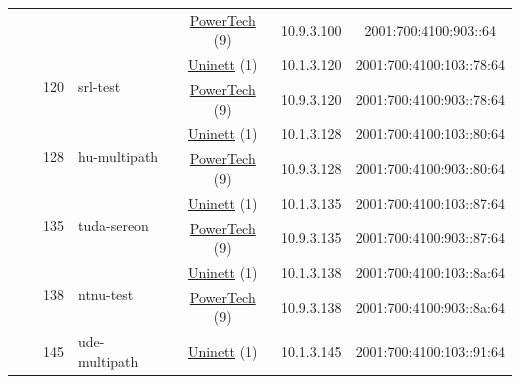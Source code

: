 \begin{small}
\begin{center}
\begin{longtable}{|c|c|c|c|c|c|c|c|}
  &  & \multicolumn{2}{|c|}{} & \multicolumn{2}{|c|}{\tiny{\href{http://www.powertech.no}{PowerTech} (9)}} & \tiny{10.9.3.100} & \tiny{2001:700:4100:903::64} \\* \cline{3-3}\cline{4-4}\cline{5-5}\cline{6-6}\cline{7-7}\cline{8-8}
  &  & \multirow{2}{*}{\tiny{120}} & \multicolumn{1}{|l|}{\multirow{2}{*}{\tiny{srl-test}}} & \multicolumn{2}{|c|}{\tiny{\href{https://www.uninett.no}{Uninett} (1)}} & \tiny{10.1.3.120} & \tiny{2001:700:4100:103::78:64} \\* \cline{5-5}\cline{6-6}\cline{7-7}\cline{8-8}
  &  &  &  & \multicolumn{2}{|c|}{\tiny{\href{http://www.powertech.no}{PowerTech} (9)}} & \tiny{10.9.3.120} & \tiny{2001:700:4100:903::78:64} \\* \cline{3-3}\cline{4-4}\cline{5-5}\cline{6-6}\cline{7-7}\cline{8-8}
  &  & \multirow{2}{*}{\tiny{128}} & \multicolumn{1}{|l|}{\multirow{2}{*}{\tiny{hu-multipath}}} & \multicolumn{2}{|c|}{\tiny{\href{https://www.uninett.no}{Uninett} (1)}} & \tiny{10.1.3.128} & \tiny{2001:700:4100:103::80:64} \\* \cline{5-5}\cline{6-6}\cline{7-7}\cline{8-8}
  &  &  &  & \multicolumn{2}{|c|}{\tiny{\href{http://www.powertech.no}{PowerTech} (9)}} & \tiny{10.9.3.128} & \tiny{2001:700:4100:903::80:64} \\* \cline{3-3}\cline{4-4}\cline{5-5}\cline{6-6}\cline{7-7}\cline{8-8}
  &  & \multirow{2}{*}{\tiny{135}} & \multicolumn{1}{|l|}{\multirow{2}{*}{\tiny{tuda-sereon}}} & \multicolumn{2}{|c|}{\tiny{\href{https://www.uninett.no}{Uninett} (1)}} & \tiny{10.1.3.135} & \tiny{2001:700:4100:103::87:64} \\* \cline{5-5}\cline{6-6}\cline{7-7}\cline{8-8}
  &  &  &  & \multicolumn{2}{|c|}{\tiny{\href{http://www.powertech.no}{PowerTech} (9)}} & \tiny{10.9.3.135} & \tiny{2001:700:4100:903::87:64} \\* \cline{3-3}\cline{4-4}\cline{5-5}\cline{6-6}\cline{7-7}\cline{8-8}
  &  & \multirow{2}{*}{\tiny{138}} & \multicolumn{1}{|l|}{\multirow{2}{*}{\tiny{ntnu-test}}} & \multicolumn{2}{|c|}{\tiny{\href{https://www.uninett.no}{Uninett} (1)}} & \tiny{10.1.3.138} & \tiny{2001:700:4100:103::8a:64} \\* \cline{5-5}\cline{6-6}\cline{7-7}\cline{8-8}
  &  &  &  & \multicolumn{2}{|c|}{\tiny{\href{http://www.powertech.no}{PowerTech} (9)}} & \tiny{10.9.3.138} & \tiny{2001:700:4100:903::8a:64} \\* \cline{3-3}\cline{4-4}\cline{5-5}\cline{6-6}\cline{7-7}\cline{8-8}
  &  & \multirow{2}{*}{\tiny{145}} & \multicolumn{1}{|l|}{\multirow{2}{*}{\tiny{ude-multipath}}} & \multicolumn{2}{|c|}{\tiny{\href{https://www.uninett.no}{Uninett} (1)}} & \tiny{10.1.3.145} & \tiny{2001:700:4100:103::91:64} \\* \cline{5-5}\cline{6-6}\cline{7-7}\cline{8-8}

\end{longtable}
\end{center}
\end{small}
